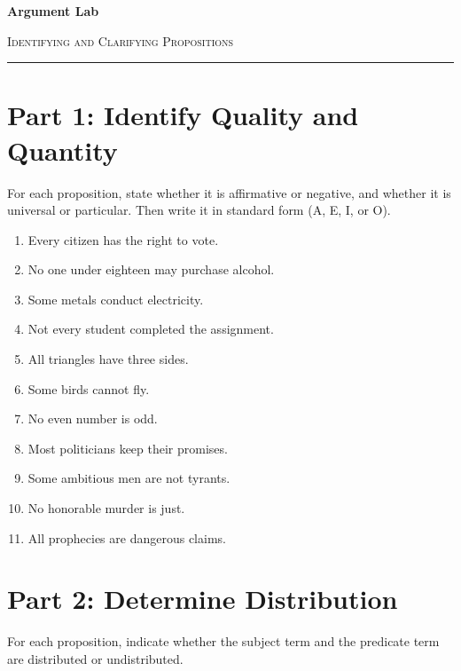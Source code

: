 \documentclass[12pt]{article}
\begin{document}
\begin{center}
{\LARGE\bfseries Argument Lab}\par\vspace{0.25em}
{\large\scshape Identifying and Clarifying Propositions}\par\vspace{0.5em}
\rule{0.82\textwidth}{0.4pt}
\end{center}

\section*{Part 1: Identify Quality and Quantity}
For each proposition, state whether it is affirmative or negative, and whether it is universal or particular. Then write it in standard form (A, E, I, or O).

\begin{enumerate}[leftmargin=*]
\item Every citizen has the right to vote.

\item No one under eighteen may purchase alcohol.

\item Some metals conduct electricity.

\item Not every student completed the assignment.

\item All triangles have three sides.

\item Some birds cannot fly.

\item No even number is odd.

\item Most politicians keep their promises.
\item Some ambitious men are not tyrants.
\item No honorable murder is just.
\item All prophecies are dangerous claims.
\end{enumerate}

\section*{Part 2: Determine Distribution}
For each proposition, indicate whether the subject term and the predicate term are distributed or undistributed.
\end{document}
